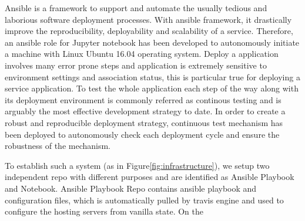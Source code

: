 Ansible is a framework to support and automate the usually tedious and laborious software deployment processes. With ansible framework, it drastically improve the reproducibility, deployability and scalability of a service. Therefore, 
an ansible role for Jupyter notebook has been developed to autonomously initiate a machine with Linux Ubuntu 16.04 operating system. 
Deploy a application involves many error prone steps and application is extremely sensitive to environment settings and association status, this is particular true for deploying a service application. To test the whole application each step of the way along with its deployment environment is commonly referred as continous testing and is arguably the most effective development strategy to date. In order to create a robust and reproducible deployment strategy, continuous test mechanism has been deployed to autonomously check each deployment cycle and ensure the robustness of the mechanism. 

To establish such a system (as in Figure\ref{fig:infrastructure}), we setup two independent repo with different purposes and are identified as Ansible Playbook and Notebook.  Ansible Playbook Repo contains ansible playbook and configuration files, which is automatically pulled by travis engine and used to configure the hosting servers from vanilla state. On the 